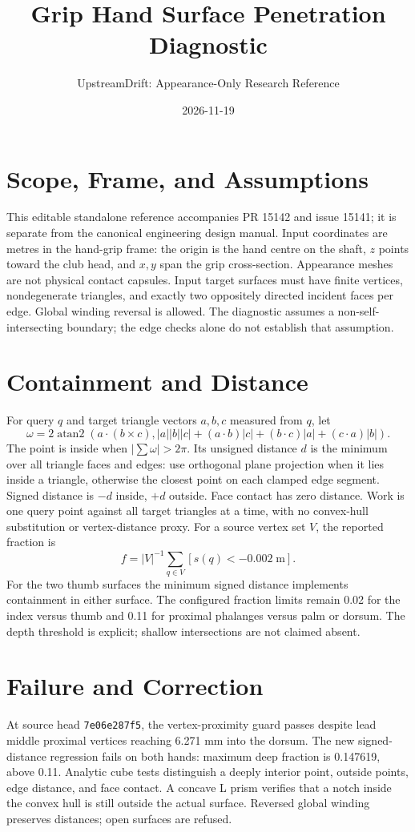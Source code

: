 \documentclass{article}
\title{Grip Hand Surface Penetration Diagnostic}
\author{UpstreamDrift: Appearance-Only Research Reference}
\date{2026-11-19}
\begin{document}
\maketitle
\section{Scope, Frame, and Assumptions}
This editable standalone reference accompanies PR 15142 and issue 15141;
it is separate from the canonical engineering design manual.
Input coordinates are metres in the hand-grip frame: the origin is the hand
centre on the shaft, $z$ points toward the club head, and $x,y$ span the
grip cross-section. Appearance meshes are not physical contact capsules.
Input target surfaces must have finite vertices, nondegenerate triangles,
and exactly two oppositely directed incident faces per edge. Global winding
reversal is allowed. The diagnostic assumes a non-self-intersecting boundary;
the edge checks alone do not establish that assumption.
\section{Containment and Distance}
For query $q$ and target triangle vectors $a,b,c$ measured from $q$, let
\[
 \omega=2\operatorname{atan2}\left(a\cdot(b\times c),
 |a||b||c|+(a\cdot b)|c|+(b\cdot c)|a|+(c\cdot a)|b|\right).
\]
The point is inside when $|\sum\omega|>2\pi$. Its unsigned distance $d$
is the minimum over all triangle faces and edges: use orthogonal plane
projection when it lies inside a triangle, otherwise the closest point on
each clamped edge segment. Signed distance is $-d$ inside, $+d$ outside.
Face contact has zero distance. Work is one query point against all target
triangles at a time, with no convex-hull substitution or vertex-distance proxy.
For a source vertex set $V$, the reported fraction is
\[
 f=|V|^{-1}\sum_{q\in V}[s(q)<-0.002\;\mathrm{m}].
\]
For the two thumb surfaces the minimum signed distance implements containment
in either surface. The configured fraction limits remain 0.02 for the index
versus thumb and 0.11 for proximal phalanges versus palm or dorsum.
The depth threshold is explicit; shallow intersections are not claimed absent.
\section{Failure and Correction}
At source head \texttt{7e06e287f5}, the vertex-proximity guard passes despite
lead middle proximal vertices reaching 6.271 mm into the dorsum. The new
signed-distance regression fails on both hands: maximum deep fraction is
0.147619, above 0.11. Analytic cube tests distinguish a deeply interior point,
outside points, edge distance, and face contact. A concave L prism verifies
that a notch inside the convex hull is still outside the actual surface.
Reversed global winding preserves distances; open surfaces are refused.
\end{document}
